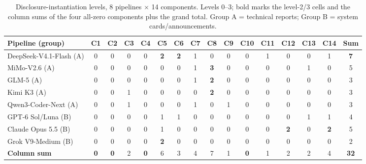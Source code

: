 \documentclass[10pt]{article}
\begin{document}
\begin{table}
\centering
\caption{Disclosure-instantiation levels, 8 pipelines $\times$ 14 components. Levels 0--3; bold marks the level-2/3 cells and the column sums of the four all-zero components plus the grand total. Group A = technical reports; Group B = system cards/announcements.}
\label{tab:matrix}
\small
\begin{tabular}{l c c c c c c c c c c c c c c c}
\toprule
Pipeline (group) & C1 & C2 & C3 & C4 & C5 & C6 & C7 & C8 & C9 & C10 & C11 & C12 & C13 & C14 & Sum \\
\midrule
DeepSeek-V4.1-Flash (A) & 0 & 0 & 0 & 0 & \textbf{2} & \textbf{2} & 1 & 0 & 0 & 0 & 1 & 0 & 0 & 1 & \textbf{7} \\
MiMo-V2.6 (A)          & 0 & 0 & 0 & 0 & 0 & 0 & 1 & \textbf{3} & 0 & 0 & 0 & 0 & 1 & 0 & 5 \\
GLM-5 (A)              & 0 & 0 & 0 & 0 & 0 & 0 & 1 & \textbf{2} & 0 & 0 & 0 & 0 & 0 & 0 & 3 \\
Kimi K3 (A)            & 0 & 0 & 1 & 0 & 0 & 0 & 0 & \textbf{2} & 0 & 0 & 0 & 0 & 0 & 0 & 3 \\
Qwen3-Coder-Next (A)   & 0 & 0 & 1 & 0 & 0 & 0 & 1 & 0 & 1 & 0 & 0 & 0 & 0 & 0 & 3 \\
GPT-6 Sol/Luna (B)     & 0 & 0 & 0 & 0 & 1 & 1 & 0 & 0 & 0 & 0 & 0 & 0 & 1 & 1 & 4 \\
Claude Opus 5.5 (B)    & 0 & 0 & 0 & 0 & 1 & 0 & 0 & 0 & 0 & 0 & 0 & \textbf{2} & 0 & \textbf{2} & 5 \\
Grok V9-Medium (B)     & 0 & 0 & 0 & 0 & \textbf{2} & 0 & 0 & 0 & 0 & 0 & 0 & 0 & 0 & 0 & 2 \\
\midrule
\textbf{Column sum} & \textbf{0} & \textbf{0} & 2 & \textbf{0} & 6 & 3 & 4 & 7 & 1 & \textbf{0} & 1 & 2 & 2 & 4 & \textbf{32} \\
\bottomrule
\end{tabular}
\end{table}
\end{document}
